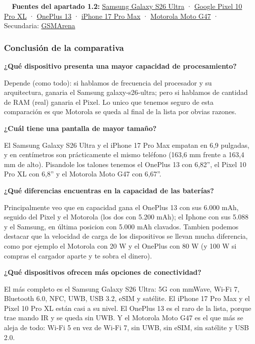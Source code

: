 \documentclass[11pt,a4paper]{article}
\newcommand{\campo}[1]{\textbf{\color{primary}#1}}
\begin{document}
	\begin{fuentesbox}
		\textbf{\color{muted}\faBook\ \ Fuentes del apartado 1.2:}
		\href{https://www.samsung.com/es/smartphones/galaxy-s26-ultra/}{Samsung Galaxy S26 Ultra} ·
		\href{https://store.google.com/product/pixel_10_pro_specs}{Google Pixel 10 Pro XL} ·
		\href{https://www.oneplus.com/es/13/specs}{OnePlus 13} ·
		\href{https://support.apple.com/es-es/125091}{iPhone 17 Pro Max} ·
		\href{https://www.motorola.com/sa/en/p/phones/moto-g/47/pmipmjs44mz}{Motorola Moto G47} ·
		Secundaria: \href{https://www.gsmarena.com/}{GSMArena}
	\end{fuentesbox}
	
	\subsubsection*{Conclusión de la comparativa}
	
	\campo{¿Qué dispositivo presenta una mayor capacidad de procesamiento?}
	
	Depende (como todo): si hablamos de frecuencia del procesador y su arquitectura, ganaria el Samsung galaxy-s26-ultra; pero si hablamos de cantidad de RAM (real) ganaria el Pixel. Lo unico que tenemos seguro de esta comparación es que Motorola se queda al final de la lista por obvias razones.
	
	\campo{¿Cuál tiene una pantalla de mayor tamaño?}
	
	El Samsung Galaxy S26 Ultra y el iPhone 17 Pro Max empatan en 6,9 pulgadas, y en centímetros son prácticamente el mismo teléfono (163,6 mm frente a 163,4 mm de alto). Pisandole los talones tenemos el OnePlus 13 con 6,82'', el Pixel 10 Pro XL con 6,8'' y el Motorola Moto G47 con 6,67''.
	
	\campo{¿Qué diferencias encuentras en la capacidad de las baterías?}
	
	Principalmente veo que en capacidad gana el OnePlus 13 con sus 6.000 mAh, seguido del Pixel y el Motorola (los dos con 5.200 mAh); el Iphone con sus 5.088 y el Samsung, en última posicion con 5.000 mAh clavados. Tambien podemos destacar que la velocidad de carga de los dispositivos se llevan mucha diferencia, como por ejemplo el Motorola con 20 W y el OnePlus con 80 W (y 100 W si compras el cargador aparte y te sobra el dinero).
	
	\campo{¿Qué dispositivos ofrecen más opciones de conectividad?}
	
	El más completo es el Samsung Galaxy S26 Ultra: 5G con mmWave, Wi-Fi 7, Bluetooth 6.0, NFC, UWB, USB 3.2, eSIM y satélite. El iPhone 17 Pro Max y el Pixel 10 Pro XL están casi a su nivel. El OnePlus 13 es el raro de la lista, porque trae mando IR y se queda sin UWB. Y el Motorola Moto G47 es el que más se aleja de todo: Wi-Fi 5 en vez de Wi-Fi 7, sin UWB, sin eSIM, sin satélite y USB 2.0.
	
\end{document}
